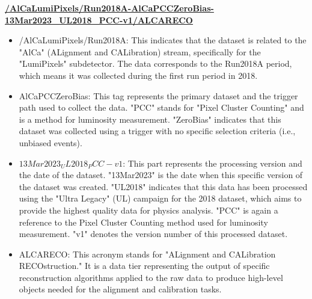 

\textbf{\url{/AlCaLumiPixels/Run2018A-AlCaPCCZeroBias-13Mar2023_UL2018_PCC-v1/ALCARECO}}


\begin{itemize}

\item /AlCaLumiPixels/Run2018A:
This indicates that the dataset is related to the "AlCa" (ALignment and CALibration) stream, specifically for the "LumiPixels" subdetector. The data corresponds to the Run2018A period, which means it was collected during the first run period in 2018.

\item AlCaPCCZeroBias:
This tag represents the primary dataset and the trigger path used to collect the data. "PCC" stands for "Pixel Cluster Counting" and is a method for luminosity measurement. "ZeroBias" indicates that this dataset was collected using a trigger with no specific selection criteria (i.e., unbiased events).

\item $13Mar2023_UL2018_PCC-v1$:
This part represents the processing version and the date of the dataset. "13Mar2023" is the date when this specific version of the dataset was created. "UL2018" indicates that this data has been processed using the "Ultra Legacy" (UL) campaign for the 2018 dataset, which aims to provide the highest quality data for physics analysis. "PCC" is again a reference to the Pixel Cluster Counting method used for luminosity measurement. "v1" denotes the version number of this processed dataset.

\item ALCARECO:
This acronym stands for "ALignment and CALibration RECOstruction." It is a data tier representing the output of specific reconstruction algorithms applied to the raw data to produce high-level objects needed for the alignment and calibration tasks.

\end{itemize}


